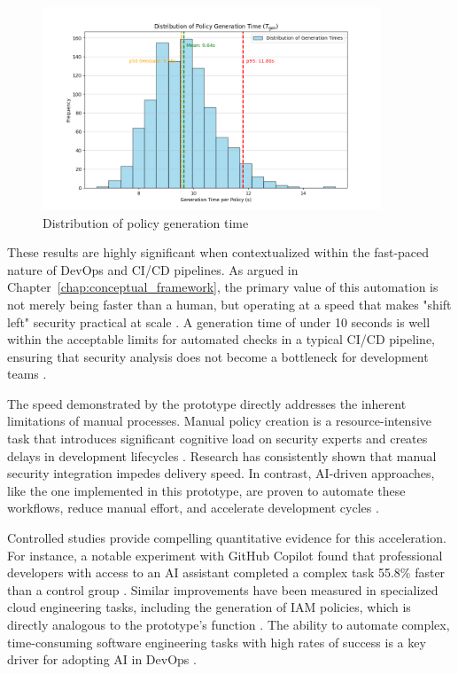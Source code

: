 \begin{figure}[htbp]
	\centering
	\includegraphics[width=0.9\textwidth]{Figures/speed_distribution.png}
	\caption{Distribution of policy generation time}\label{fig:speed-distribution}
\end{figure}

These results are highly significant when contextualized within the fast-paced nature of DevOps and CI/CD pipelines. As argued in Chapter~\ref{chap:conceptual_framework}, the primary value of this automation is not merely being faster than a human, but operating at a speed that makes "shift left" security practical at scale \cite{vaidya_devsecops_2024}. A generation time of under 10 seconds is well within the acceptable limits for automated checks in a typical CI/CD pipeline, ensuring that security analysis does not become a bottleneck for development teams \cite{li_automated_2024}.

The speed demonstrated by the prototype directly addresses the inherent limitations of manual processes. Manual policy creation is a resource-intensive task that introduces significant cognitive load on security experts and creates delays in development lifecycles \cite{gunathilaka_context-aware_2025-1, mahboob_future_2024}. Research has consistently shown that manual security integration impedes delivery speed. In contrast, AI-driven approaches, like the one implemented in this prototype, are proven to automate these workflows, reduce manual effort, and accelerate development cycles \cite{fu_ai_2025}.

Controlled studies provide compelling quantitative evidence for this acceleration. For instance, a notable experiment with GitHub Copilot found that professional developers with access to an AI assistant completed a complex task 55.8\% faster than a control group \cite{peng_impact_2023}. Similar improvements have been measured in specialized cloud engineering tasks, including the generation of IAM policies, which is directly analogous to the prototype's function \cite{kesireddy_copilot_2025}. The ability to automate complex, time-consuming software engineering tasks with high rates of success is a key driver for adopting AI in DevOps \cite{tufano_autodev_2024}.

